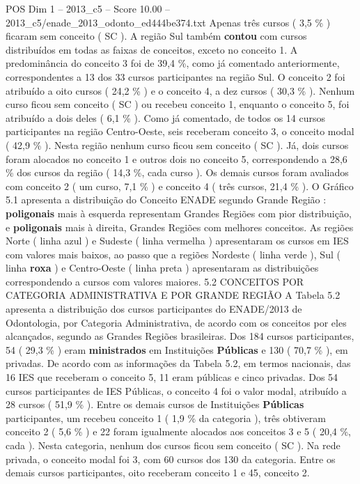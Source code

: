 \begin{textsample}{POS Dim 1 – 2013\_c5 – Score 10.00 – 2013\_c5/enade\_2013\_odonto\_ed444be374.txt}
Apenas três cursos ( 3,5 \% ) ficaram sem conceito ( SC ).
A região Sul também \textbf{contou} com cursos distribuídos em todas as faixas de conceitos, exceto no conceito 1.
A predominância do conceito 3 foi de 39,4 \%, como já comentado anteriormente, correspondentes a 13 dos 33 cursos participantes na região Sul.
O conceito 2 foi atribuído a oito cursos ( 24,2 \% ) e o conceito 4, a dez cursos ( 30,3 \% ).
Nenhum curso ficou sem conceito ( SC ) ou recebeu conceito 1, enquanto o conceito 5, foi atribuído a dois deles ( 6,1 \% ).
Como já comentado, de todos os 14 cursos participantes na região Centro-Oeste, seis receberam conceito 3, o conceito modal ( 42,9 \% ).
Nesta região nenhum curso ficou sem conceito ( SC ).
Já, dois cursos foram alocados no conceito 1 e outros dois no conceito 5, correspondendo a 28,6 \% dos cursos da região ( 14,3 \%, cada curso ).
Os demais cursos foram avaliados com conceito 2 ( um curso, 7,1 \% ) e conceito 4 ( três cursos, 21,4 \% ).
O Gráfico 5.1 apresenta a distribuição do Conceito ENADE segundo Grande Região : \textbf{poligonais} mais à esquerda representam Grandes Regiões com pior distribuição, e \textbf{poligonais} mais à direita, Grandes Regiões com melhores conceitos.
As regiões Norte ( linha azul ) e Sudeste ( linha vermelha ) apresentaram os cursos em IES com valores mais baixos, ao passo que a regiões Nordeste ( linha verde ), Sul ( linha \textbf{roxa} ) e Centro-Oeste ( linha preta ) apresentaram as distribuições correspondendo a cursos com valores maiores. 5.2 CONCEITOS POR CATEGORIA ADMINISTRATIVA E POR GRANDE REGIÃO A Tabela 5.2 apresenta a distribuição dos cursos participantes do ENADE/2013 de Odontologia, por Categoria Administrativa, de acordo com os conceitos por eles alcançados, segundo as Grandes Regiões brasileiras.
Dos 184 cursos participantes, 54 ( 29,3 \% ) eram \textbf{ministrados} em Instituições \textbf{Públicas} e 130 ( 70,7 \% ), em privadas.
De acordo com as informações da Tabela 5.2, em termos nacionais, das 16 IES que receberam o conceito 5, 11 eram públicas e cinco privadas.
Dos 54 cursos participantes de IES Públicas, o conceito 4 foi o valor modal, atribuído a 28 cursos ( 51,9 \% ).
Entre os demais cursos de Instituições \textbf{Públicas} participantes, um recebeu conceito 1 ( 1,9 \% da categoria ), três obtiveram conceito 2 ( 5,6 \% ) e 22 foram igualmente alocados aos conceitos 3 e 5 ( 20,4 \%, cada ).
Nesta categoria, nenhum dos cursos ficou sem conceito ( SC ).
Na rede privada, o conceito modal foi 3, com 60 cursos dos 130 da categoria.
Entre os demais cursos participantes, oito receberam conceito 1 e 45, conceito 2.

\end{textsample}
